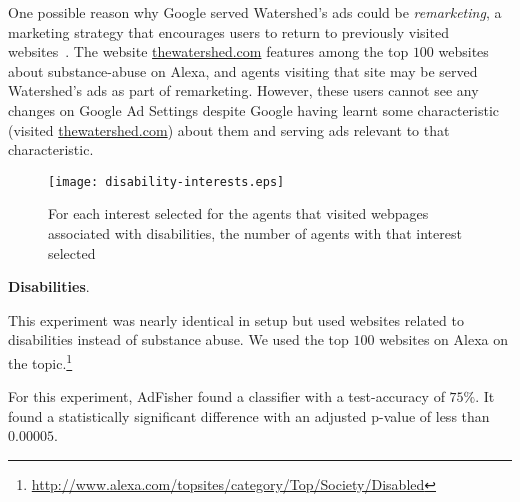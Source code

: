 \documentclass{article}
\makeatletter
\newcommand\gobblepars{\@ifnextchar\par {\expandafter\gobblepars\@gobble}{}}
\renewcommand{\paragraph}[1]{\smallskip\noindent\textbf{#1}.\ \ \gobblepars}
\newcommand{\ftnote}{\footnote}
\makeatother
\begin{document}
One possible reason why Google served Watershed's ads could be \emph{remarketing}, a marketing strategy that encourages users to return to previously visited websites~\cite{google-remarketing}. The website \url{thewatershed.com} features among the top $100$ websites about substance-abuse on Alexa, and agents visiting that site may be served Watershed's ads as part of remarketing. However, these users cannot see any changes on Google Ad Settings despite Google having learnt some characteristic (visited \url{thewatershed.com}) about them and serving ads relevant to that characteristic. 



\begin{wrapfigure}{}{9.1cm}
\texttt{[image: disability-interests.eps]}
\caption{For each interest selected for the agents that visited webpages associated with disabilities, the number of agents with that interest selected}
\label{fig:disability-settings}
\end{wrapfigure}

\paragraph{Disabilities}
This experiment was nearly identical in setup but used websites related to disabilities instead of substance abuse.
We used the top $100$ websites on Alexa on the topic.\ftnote{\url{http://www.alexa.com/topsites/category/Top/Society/Disabled}}



For this experiment, AdFisher found a classifier with a test-accuracy of $75\%$.  It found a statistically significant difference with an adjusted p-value of less than $0.00005$. 
\end{document}
